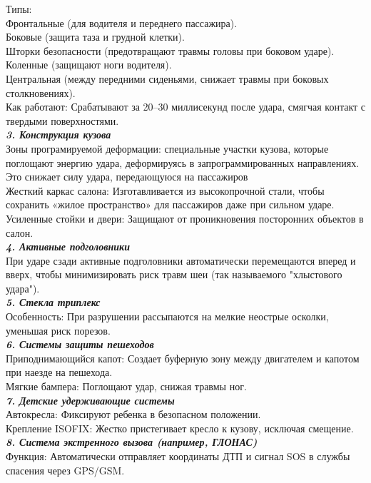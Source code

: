 Типы:\\
Фронтальные (для водителя и переднего пассажира).\\
Боковые (защита таза и грудной клетки).\\
Шторки безопасности (предотвращают травмы головы при боковом ударе).\\
Коленные (защищают ноги водителя).\\
Центральная (между передними сиденьями, снижает травмы при боковых столкновениях).\\
Как работают: Срабатывают за 20–30 миллисекунд после удара, смягчая контакт с твердыми поверхностями.\\
\textsl{{\textbf{3. Конструкция кузова}}}\\
Зоны програмируемой деформации: специальные участки кузова, которые поглощают энергию удара, деформируясь в запрограммированных направлениях. Это снижает силу удара, передающуюся на пассажиров\\
Жесткий каркас салона: Изготавливается из высокопрочной стали, чтобы сохранить «жилое пространство» для пассажиров даже при сильном ударе.\\
Усиленные стойки и двери: Защищают от проникновения посторонних объектов в салон.\\
\textsl{{\textbf{4. Активные подголовники}}}\\
При ударе сзади активные подголовники автоматически перемещаются вперед и вверх, чтобы минимизировать риск травм шеи (так называемого "хлыстового удара").\\
\textsl{{\textbf{5. Стекла  триплекс}}}\\
Особенность: При разрушении рассыпаются на мелкие неострые осколки, уменьшая риск порезов.\\
\textsl{{\textbf{6. Системы защиты пешеходов}}}\\
Приподнимающийся капот: Создает буферную зону между двигателем и капотом при наезде на пешехода.\\
Мягкие бампера: Поглощают удар, снижая травмы ног.\\
\textsl{{\textbf{7. Детские удерживающие системы}}}\\
Автокресла: Фиксируют ребенка в безопасном положении.\\
Крепление ISOFIX: Жестко пристегивает кресло к кузову, исключая смещение.\\
\textsl{{\textbf{8. Система экстренного вызова (например, ГЛОНАС)}}}\\
Функция: Автоматически отправляет координаты ДТП и сигнал SOS в службы спасения через GPS/GSM.\\
